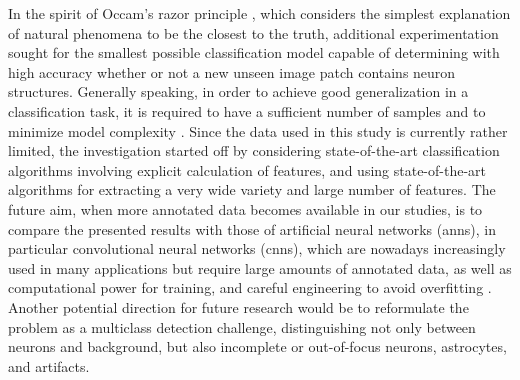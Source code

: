 In the spirit of Occam's razor principle \cite{iacca2012ockham, hong2013particle, ebrahimpour2017occam}, which considers the simplest explanation of natural phenomena to be the closest to the truth, additional experimentation sought for the smallest possible classification model capable of determining with high accuracy whether or not a new unseen image patch contains neuron structures. Generally speaking, in order to achieve good generalization in a classification task, it is required to have a sufficient number of samples and to minimize model complexity \cite{gupta2017sparse}. Since the data used in this study is currently rather limited, the investigation started off by considering state-of-the-art classification algorithms involving explicit calculation of features, and using state-of-the-art algorithms for extracting a very wide variety and large number of features. The future aim, when more annotated data becomes available in our studies, is to compare the presented results with those of artificial neural networks (\gls{ann}s), in particular convolutional neural networks (\gls{cnn}s), which are nowadays increasingly used in many applications \cite{lecun2015deep} but require large amounts of annotated data, as well as computational power for training, and careful engineering to avoid overfitting \cite{bianchini2014complexity, greenspan2016guest, tajbakhsh2016convolutional, shaikhina2017handling, litjens2017survey, shen2017deep}. Another potential direction for future research would be to reformulate the problem as a multiclass detection challenge, distinguishing not only between neurons and background, but also incomplete or out-of-focus neurons, astrocytes, and artifacts.

